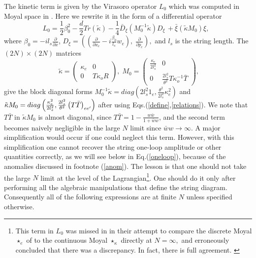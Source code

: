 \documentclass[a4paper,11pt]{article}
\begin{document}
The kinetic term is given by the Virasoro operator $L_{0}$ which was
computed in Moyal space in \cite{BM2}. Here we rewrite it in the form of a
differential operator%
\begin{equation}
L_{0}=\frac{1}{2}\beta _{0}^{2}-\frac{d}{2}Tr\left( \tilde{\kappa}\right) -%
\frac{1}{4}\bar{D}_{\xi }\left( M_{0}^{-1}\tilde{\kappa}\right) D_{\xi }\,+%
\bar{\xi}\left( \tilde{\kappa}M_{0}\right) \xi ,\;\;  \label{Lo}
\end{equation}%
where $\beta _{0}=-il_{s}\frac{\partial }{\partial \bar{x}}$, $D_{\xi
}=\left( \left( \frac{\partial }{\partial x_{e}}-i\frac{\beta _{0}}{l_{s}}%
w_{e}\right) ,\;\frac{\partial }{\partial p_{e}}\right) ,$ and $l_{s}$ is
the string length. The $\left( 2N\right) \times \left( 2N\right) $ matrices
\begin{equation}
\;\tilde{\kappa}=\left(
\begin{array}{cc}
\kappa _{e} & 0 \\
0 & T\kappa _{o}R%
\end{array}%
\right) ,\;M_{0}=\left(
\begin{array}{cc}
\frac{\kappa _{e}}{2l_{s}^{2}} & 0 \\
0 & \frac{2l_{s}^{2}}{\theta ^{2}}T\kappa _{o}^{-1}\bar{T}%
\end{array}%
\right) ,  \label{Mo}
\end{equation}%
give the block diagonal forms $M_{0}^{-1}\tilde{\kappa}=diag\left(
2l_{s}^{2}1_{e},\frac{\theta ^{2}}{2l_{s}^{2}}\kappa _{e}^{2}\right) $ and $%
\tilde{\kappa}M_{0}=diag\left( \frac{\kappa _{e}^{2}}{2l_{s}^{2}},\frac{%
2l_{s}^{2}}{\theta ^{2}}\left( T\bar{T}\right) _{ee^{\prime }}\right) $
after using Eqs.(\ref{define},\ref{relations}). We note that $T\bar{T}$ in $%
\tilde{\kappa}M_{0}$ is almost diagonal, since $T\bar{T}=1-\frac{w\bar{w}}{1+%
\bar{w}w}$, and the second term becomes naively negligible in the large $N$
limit since $\bar{w}w\rightarrow \infty $. A major simplification would
occur if one could neglect this term. However, with this simplification one
cannot recover the string one-loop amplitude or other quantities correctly,
as we will see below in Eq.(\ref{oneloop}), because of the anomalies
discussed in footnote (\ref{anom}). The lesson is that one should not take
the large $N$ limit at the level of the Lagrangian\footnote{%
This term in $L_{0}$ was missed in \cite{DLMZ} in their attempt to compare
the discrete Moyal $\star _{e}$ of \cite{B} to the continuous Moyal $\star
_{\kappa }$ directly at $N=\infty ,$ and erroneously concluded that there
was a discrepancy. In fact, there is full agreement. \label{wrong}}. One
should do it only after performing all the algebraic manipulations that
define the string diagram. Consequently all of the following expressions are
at finite $N$ unless specified otherwise.
\end{document}
